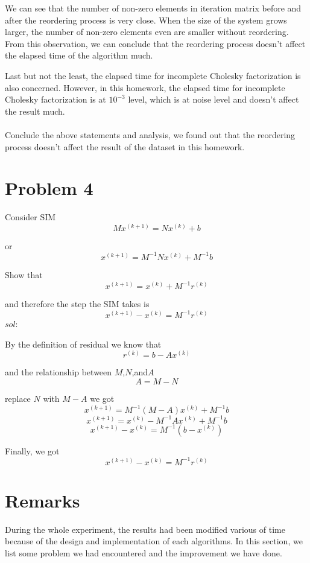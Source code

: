 \documentclass{article}
\begin{document}
We can see that the number of non-zero elements in iteration matrix before and after the reordering process is very close. When the size of the system grows larger, the number of non-zero elements even are smaller without reordering. From this observation, we can conclude that the reordering process doesn't affect the elapsed time of the algorithm much.

Last but not the least, the elapsed time for incomplete Cholesky factorization is also concerned. However, in this homework, the elapsed time for incomplete Cholesky factorization is at $10^{-3}$ level, which is at noise level and doesn't affect the result much.

\paragraph{}
Conclude the above statements and analysis, we found out that the reordering process doesn't affect the result of the dataset in this homework.

\section{Problem 4}

Consider SIM
$$Mx^{(k+1)}=Nx^{(k)} + b$$

or
$$x^{(k+1)} = M^{-1}Nx^{(k)} + M^{-1}b$$

Show that
$$x^{(k+1)} = x^{(k)} + M^{-1}r^{(k)}$$

and therefore the step the SIM takes is
$$x^{(k+1)}-x^{(k)}=M^{-1}r^{(k)}$$
$sol:$

By the definition of residual we know that
$$r^{(k)} = b - Ax^{(k)}$$

and the relationship between $M$,$N$,and$A$
$$A = M-N$$


replace $N$ with $M-A$ we got
$$x^{(k+1)} = M^{-1}(M-A)x^{(k)} + M^{-1}b$$
$$x^{(k+1)} = x^{(k)} - M^{-1}Ax^{(k)} + M^{-1}b$$
$$x^{(k+1)}-x^{(k)}=M^{-1}(b-x^{(k)})$$

Finally, we got
$$x^{(k+1)}-x^{(k)}=M^{-1}r^{(k)}$$

\section{Remarks}

During the whole experiment, the results had been modified various of time because of the design and implementation of each algorithms. In this section, we list some problem we had encountered and the improvement we have done.
\end{document}
